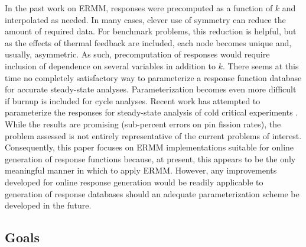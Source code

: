 In the past work on ERMM, responses were precomputed as a function of 
$k$ and interpolated as needed.  In many cases, clever use of symmetry 
can reduce the amount of required data.  For benchmark problems, this
reduction is helpful, but as the effects of thermal feedback are included, 
each node becomes unique and, usually, asymmetric.  As such, precomputation 
of responses would require inclusion of dependence on several variables
in addition to $k$.
There seems at this time no completely satisfactory way to parameterize 
a response function database for accurate steady-state analyses.  
Parameterization becomes even more difficult if burnup is included 
for cycle analyses. Recent work has attempted to parameterize the 
responses for steady-state analysis of cold critical 
experiments \cite{hino2012bwr}.  While the results
are promising (sub-percent errors on pin fission rates), the problem 
assessed is not entirely representative of the current problems of interest.
Consequently, this paper focuses on ERMM implementations suitable for 
online generation of response functions because, at present, this appears 
to be the only meaningful manner in which to apply ERMM.  However, any
improvements developed for online response generation would be readily 
applicable to generation of response databases should an adequate 
parameterization scheme be developed in the future.

\subsection{Goals}

